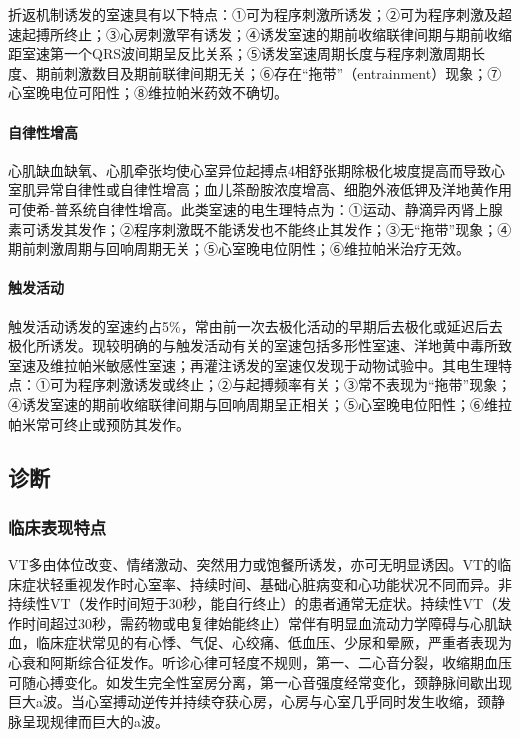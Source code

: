 折返机制诱发的室速具有以下特点：①可为程序刺激所诱发；②可为程序刺激及超速起搏所终止；③心房刺激罕有诱发；④诱发室速的期前收缩联律间期与期前收缩距室速第一个QRS波间期呈反比关系；⑤诱发室速周期长度与程序刺激周期长度、期前刺激数目及期前联律间期无关；⑥存在“拖带”（entrainment）现象；⑦心室晚电位可阳性；⑧维拉帕米药效不确切。

\paragraph{自律性增高}

心肌缺血缺氧、心肌牵张均使心室异位起搏点4相舒张期除极化坡度提高而导致心室肌异常自律性或自律性增高；血儿茶酚胺浓度增高、细胞外液低钾及洋地黄作用可使希-普系统自律性增高。此类室速的电生理特点为：①运动、静滴异丙肾上腺素可诱发其发作；②程序刺激既不能诱发也不能终止其发作；③无“拖带”现象；④期前刺激周期与回响周期无关；⑤心室晚电位阴性；⑥维拉帕米治疗无效。

\paragraph{触发活动}

触发活动诱发的室速约占5\%，常由前一次去极化活动的早期后去极化或延迟后去极化所诱发。现较明确的与触发活动有关的室速包括多形性室速、洋地黄中毒所致室速及维拉帕米敏感性室速；再灌注诱发的室速仅发现于动物试验中。其电生理特点：①可为程序刺激诱发或终止；②与起搏频率有关；③常不表现为“拖带”现象；④诱发室速的期前收缩联律间期与回响周期呈正相关；⑤心室晚电位阳性；⑥维拉帕米常可终止或预防其发作。

\subsection{诊断}

\subsubsection{临床表现特点}

VT多由体位改变、情绪激动、突然用力或饱餐所诱发，亦可无明显诱因。VT的临床症状轻重视发作时心室率、持续时间、基础心脏病变和心功能状况不同而异。非持续性VT（发作时间短于30秒，能自行终止）的患者通常无症状。持续性VT（发作时间超过30秒，需药物或电复律始能终止）常伴有明显血流动力学障碍与心肌缺血，临床症状常见的有心悸、气促、心绞痛、低血压、少尿和晕厥，严重者表现为心衰和阿斯综合征发作。听诊心律可轻度不规则，第一、二心音分裂，收缩期血压可随心搏变化。如发生完全性室房分离，第一心音强度经常变化，颈静脉间歇出现巨大a波。当心室搏动逆传并持续夺获心房，心房与心室几乎同时发生收缩，颈静脉呈现规律而巨大的a波。


